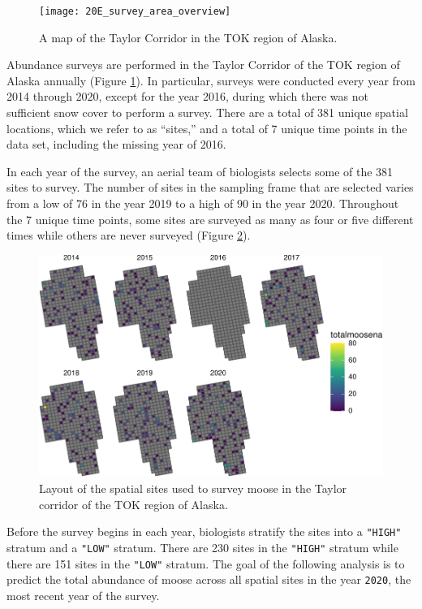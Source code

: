 \documentclass[]{interact}
\theoremstyle{plain}%
\theoremstyle{definition}
\theoremstyle{remark}
\begin{document}
\begin{figure}
\texttt{[image: 20E\_survey\_area\_overview]} \caption{\label{fig:tokplot} A map of the Taylor Corridor in the TOK region of Alaska.}\label{fig:tokplot}
\end{figure}

Abundance surveys are performed in the Taylor Corridor of the TOK region
of Alaska annually (Figure \ref{fig:tokplot}). In particular, surveys
were conducted every year from 2014 through 2020, except for the year
2016, during which there was not sufficient snow cover to perform a
survey. There are a total of 381 unique spatial locations, which we
refer to as ``sites,'' and a total of 7 unique time points in the data
set, including the missing year of 2016.

In each year of the survey, an aerial team of biologists selects some of
the 381 sites to survey. The number of sites in the sampling frame that
are selected varies from a low of 76 in the year 2019 to a high of 90 in
the year 2020. Throughout the 7 unique time points, some sites are
surveyed as many as four or five different times while others are never
surveyed (Figure \ref{fig:tokplotyears}).

\begin{figure}
\centering
\includegraphics{fpspatiotemp_manu_files/figure-latex/tokplotyears-1.pdf}
\caption{\label{fig:tokplotyears} Layout of the spatial sites used to
survey moose in the Taylor corridor of the TOK region of Alaska.}
\end{figure}

Before the survey begins in each year, biologists stratify the sites
into a \texttt{"HIGH"} stratum and a \texttt{"LOW"} stratum. There are
230 sites in the \texttt{"HIGH"} stratum while there are 151 sites in
the \texttt{"LOW"} stratum. The goal of the following analysis is to
predict the total abundance of moose across all spatial sites in the
year \texttt{2020}, the most recent year of the survey.
\end{document}
